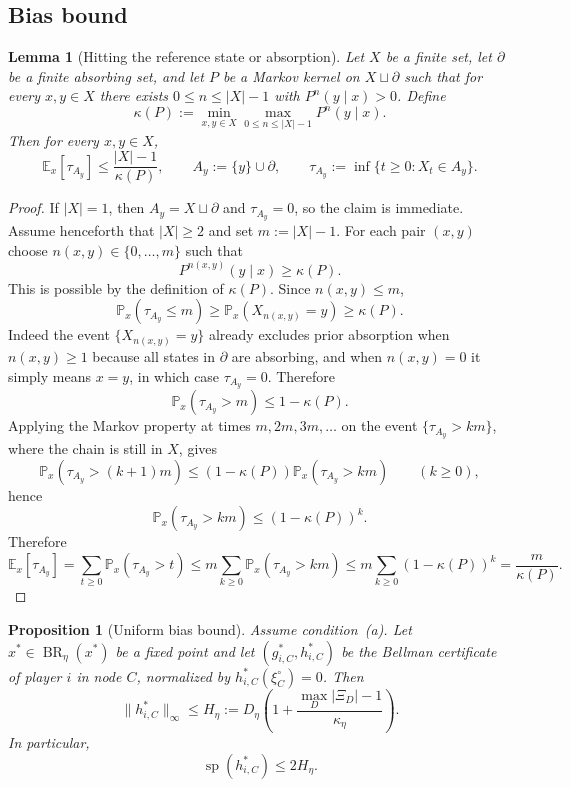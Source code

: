 \documentclass[12pt]{article}
\newtheorem{proposition}[theorem]{Proposition}
\newtheorem{lemma}[theorem]{Lemma}
\theoremstyle{definition}
\newcommand{\E}{\mathbb{E}}
\newcommand{\Pb}{\mathbb{P}}
\newcommand{\1}{\mathbf{1}}
\DeclareMathOperator{\spn}{sp}
\DeclareMathOperator{\BR}{BR}
\begin{document}
\subsection{Bias bound}


\begin{lemma}[Hitting the reference state or absorption]
\label{lem:hitting-time}
Let $X$ be a finite set, let $\partial$ be a finite absorbing set, and let $P$ be a
Markov kernel on $X\sqcup\partial$ such that for every $x,y\in X$ there exists
$0\le n\le |X|-1$ with $P^n(y\mid x)>0$. Define
\[
\kappa(P):=\min_{x,y\in X}\max_{0\le n\le |X|-1}P^n(y\mid x).
\]
Then for every $x,y\in X$,
\[
\E_x[\tau_{A_y}]\le \frac{|X|-1}{\kappa(P)},
\qquad
A_y:=\{y\}\cup \partial,
\qquad
\tau_{A_y}:=\inf\{t\ge 0:X_t\in A_y\}.
\]
\end{lemma}

\begin{proof}
If $|X|=1$, then $A_y=X\sqcup\partial$ and $\tau_{A_y}=0$, so the claim is
immediate. Assume henceforth that $|X|\ge 2$ and set $m:=|X|-1$. For each pair
$(x,y)$ choose
$n(x,y)\in\{0,\dots,m\}$ such that
\[
P^{n(x,y)}(y\mid x)\ge \kappa(P).
\]
This is possible by the definition of $\kappa(P)$. Since $n(x,y)\le m$,
\[
\Pb_x(\tau_{A_y}\le m)\ge \Pb_x(X_{n(x,y)}=y)\ge \kappa(P).
\]
Indeed the event $\{X_{n(x,y)}=y\}$ already excludes prior absorption when
$n(x,y)\ge 1$ because all states in $\partial$ are absorbing, and when
$n(x,y)=0$ it simply means $x=y$, in which case $\tau_{A_y}=0$. Therefore
\[
\Pb_x(\tau_{A_y}>m)\le 1-\kappa(P).
\]
Applying the Markov property at times $m,2m,3m,\dots$ on the event
$\{\tau_{A_y}>km\}$, where the chain is still in $X$, gives
\[
\Pb_x(\tau_{A_y}>(k+1)m)\le (1-\kappa(P))\Pb_x(\tau_{A_y}>km)
\qquad (k\ge 0),
\]
hence
\[
\Pb_x(\tau_{A_y}>km)\le (1-\kappa(P))^k.
\]
Therefore
\[
\E_x[\tau_{A_y}]
=
\sum_{t\ge 0}\Pb_x(\tau_{A_y}>t)
\le
m\sum_{k\ge 0}\Pb_x(\tau_{A_y}>km)
\le
m\sum_{k\ge 0}(1-\kappa(P))^k
=
\frac{m}{\kappa(P)}.
\]
\end{proof}


\begin{proposition}[Uniform bias bound]
\label{prop:bias-span}
Assume condition~\textnormal{(a)}. Let $x^*\in\BR_\eta(x^*)$ be a fixed point and
let $(g_{i,C}^*,h_{i,C}^*)$ be the Bellman certificate of player $i$ in node $C$,
normalized by $h_{i,C}^*(\xi_C^\circ)=0$. Then
\[
\|h_{i,C}^*\|_\infty\le
H_\eta:=D_\eta\left(1+\frac{\max_D|\Xi_D|-1}{\kappa_\eta}\right).
\]
In particular,
\[
\spn(h_{i,C}^*)\le 2H_\eta.
\]
\end{proposition}
\end{document}
